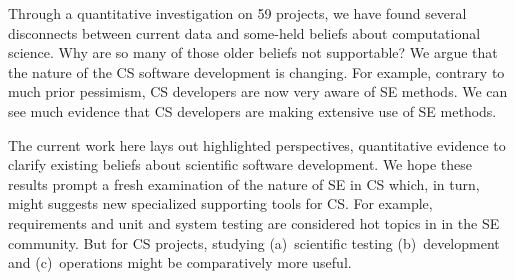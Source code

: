 \documentclass[sigconf]{acmart}
\begin{document}
Through a quantitative investigation on 59 projects, we have found several disconnects between current data
and some-held beliefs about computational science.
Why are so many of those older beliefs not supportable?
We argue that  the  nature of the CS software development is changing. 
For example, contrary to much prior pessimism,
CS developers are now very
aware of SE methods. 
We can see much evidence that CS developers are making
extensive use of SE methods.

 
 The current work here lays out highlighted perspectives, quantitative evidence to clarify existing beliefs about scientific software development.
 We hope these results  prompt a fresh examination of the nature of SE in  CS which, in turn, might suggests 
  new   specialized supporting tools for CS.
For example, requirements and unit and system testing  are considered hot topics in in the SE community.
But for CS projects,   studying  (a)~scientific testing (b)~development and
(c)~operations might be comparatively more useful.




\balance


\end{document}
